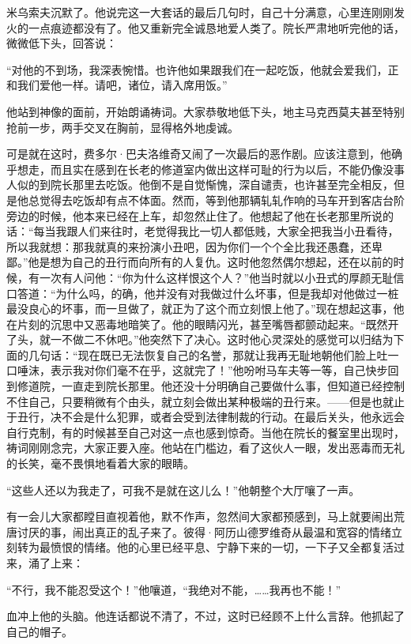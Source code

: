 \par 米乌索夫沉默了。他说完这一大套话的最后几句时，自己十分满意，心里连刚刚发火的一点痕迹都没有了。他又重新完全诚恳地爱人类了。院长严肃地听完他的话，微微低下头，回答说：
\par “对他的不到场，我深表惋惜。也许他如果跟我们在一起吃饭，他就会爱我们，正和我们爱他一样。请吧，诸位，请入席用饭。”
\par 他站到神像的面前，开始朗诵祷词。大家恭敬地低下头，地主马克西莫夫甚至特别抢前一步，两手交叉在胸前，显得格外地虔诚。
\par 可是就在这时，费多尔·巴夫洛维奇又闹了一次最后的恶作剧。应该注意到，他确乎想走，而且实在感到在长老的修道室内做出这样可耻的行为以后，不能仍像没事人似的到院长那里去吃饭。他倒不是自觉惭愧，深自谴责，也许甚至完全相反，但是他总觉得去吃饭却有点不体面。然而，等到他那辆轧轧作响的马车开到客店台阶旁边的时候，他本来已经在上车，却忽然止住了。他想起了他在长老那里所说的话：“每当我跟人们来往时，老觉得我比一切人都低贱，大家全把我当小丑看待，所以我就想：那我就真的来扮演小丑吧，因为你们一个个全比我还愚蠢，还卑鄙。”他是想为自己的丑行而向所有的人复仇。这时他忽然偶尔想起，还在以前的时候，有一次有人问他：“你为什么这样恨这个人？”他当时就以小丑式的厚颜无耻信口答道：“为什么吗，的确，他并没有对我做过什么坏事，但是我却对他做过一桩最没良心的坏事，而一旦做了，就正为了这个而立刻恨上他了。”现在想起这事，他在片刻的沉思中又恶毒地暗笑了。他的眼睛闪光，甚至嘴唇都颤动起来。“既然开了头，就一不做二不休吧。”他突然下了决心。这时他心灵深处的感觉可以归结为下面的几句话：“现在既已无法恢复自己的名誉，那就让我再无耻地朝他们脸上吐一口唾沫，表示我对你们毫不在乎，这就完了！”他吩咐马车夫等一等，自己快步回到修道院，一直走到院长那里。他还没十分明确自己要做什么事，但知道已经控制不住自己，只要稍微有个由头，就立刻会做出某种极端的丑行来。——但是也就止于丑行，决不会是什么犯罪，或者会受到法律制裁的行动。在最后关头，他永远会自行克制，有的时候甚至自己对这一点也感到惊奇。当他在院长的餐室里出现时，祷词刚刚念完，大家正要入座。他站在门槛边，看了这伙人一眼，发出恶毒而无礼的长笑，毫不畏惧地看着大家的眼睛。
\par “这些人还以为我走了，可我不是就在这儿么！”他朝整个大厅嚷了一声。
\par 有一会儿大家都瞠目直视着他，默不作声，忽然间大家都预感到，马上就要闹出荒唐讨厌的事，闹出真正的乱子来了。彼得·阿历山德罗维奇从最温和宽容的情绪立刻转为最愤恨的情绪。他的心里已经平息、宁静下来的一切，一下子又全都复活过来，涌了上来：
\par “不行，我不能忍受这个！”他嚷道，“我绝对不能，……我再也不能！”
\par 血冲上他的头脑。他连话都说不清了，不过，这时已经顾不上什么言辞。他抓起了自己的帽子。
